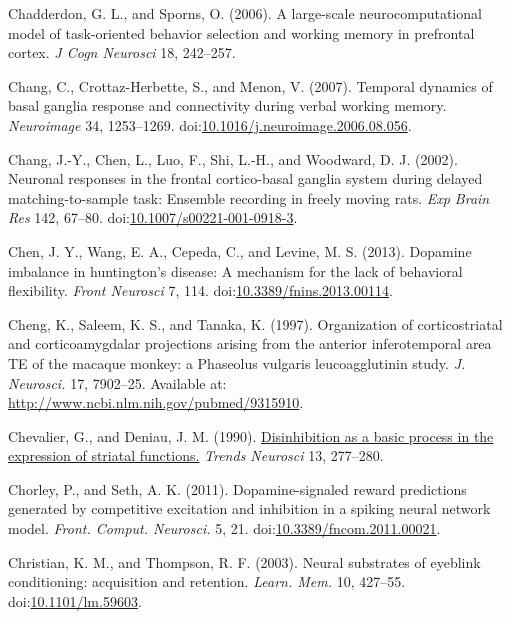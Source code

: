 \documentclass[
  11pt,
  a4paper,
]{scrbook}
\newlength{\cslhangindent}
\newenvironment{CSLReferences}[2] %
 {\begin{list}{}{%
  \setlength{\itemindent}{0pt}
  \setlength{\leftmargin}{0pt}
  \setlength{\parsep}{0pt}
  \ifodd #1
   \setlength{\leftmargin}{\cslhangindent}
   \setlength{\itemindent}{-1\cslhangindent}
  \fi
  \setlength{\itemsep}{#2\baselineskip}}}
 {\end{list}}
\begin{document}
\begin{CSLReferences}{1}{1}
Chadderdon, G. L., and Sporns, O. (2006). A large-scale
neurocomputational model of task-oriented behavior selection and working
memory in prefrontal cortex. \emph{J Cogn Neurosci} 18, 242--257.

Chang, C., Crottaz-Herbette, S., and Menon, V. (2007). Temporal dynamics
of basal ganglia response and connectivity during verbal working memory.
\emph{Neuroimage} 34, 1253--1269.
doi:\href{https://doi.org/10.1016/j.neuroimage.2006.08.056}{10.1016/j.neuroimage.2006.08.056}.

Chang, J.-Y., Chen, L., Luo, F., Shi, L.-H., and Woodward, D. J. (2002).
Neuronal responses in the frontal cortico-basal ganglia system during
delayed matching-to-sample task: Ensemble recording in freely moving
rats. \emph{Exp Brain Res} 142, 67--80.
doi:\href{https://doi.org/10.1007/s00221-001-0918-3}{10.1007/s00221-001-0918-3}.

Chen, J. Y., Wang, E. A., Cepeda, C., and Levine, M. S. (2013). Dopamine
imbalance in huntington's disease: A mechanism for the lack of
behavioral flexibility. \emph{Front Neurosci} 7, 114.
doi:\href{https://doi.org/10.3389/fnins.2013.00114}{10.3389/fnins.2013.00114}.

Cheng, K., Saleem, K. S., and Tanaka, K. (1997). {Organization of
corticostriatal and corticoamygdalar projections arising from the
anterior inferotemporal area TE of the macaque monkey: a Phaseolus
vulgaris leucoagglutinin study.} \emph{J. Neurosci.} 17, 7902--25.
Available at: \url{http://www.ncbi.nlm.nih.gov/pubmed/9315910}.

Chevalier, G., and Deniau, J. M. (1990).
\href{https://www.ncbi.nlm.nih.gov/pubmed/1695403}{Disinhibition as a
basic process in the expression of striatal functions.} \emph{Trends
Neurosci} 13, 277--280.

Chorley, P., and Seth, A. K. (2011). {Dopamine-signaled reward
predictions generated by competitive excitation and inhibition in a
spiking neural network model.} \emph{Front. Comput. Neurosci.} 5, 21.
doi:\href{https://doi.org/10.3389/fncom.2011.00021}{10.3389/fncom.2011.00021}.

Christian, K. M., and Thompson, R. F. (2003). {Neural substrates of
eyeblink conditioning: acquisition and retention.} \emph{Learn. Mem.}
10, 427--55.
doi:\href{https://doi.org/10.1101/lm.59603}{10.1101/lm.59603}.


\end{CSLReferences}
\end{document}

